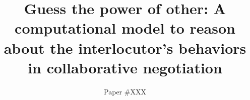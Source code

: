 \documentclass[sigconf]{aamas}  %
\begin{document}
	
	\title{Guess the power of other: A computational model to reason about the interlocutor's behaviors in collaborative negotiation}  %
	
	
	
	
	\author{Paper \#XXX}  %
	
	
\end{document}

